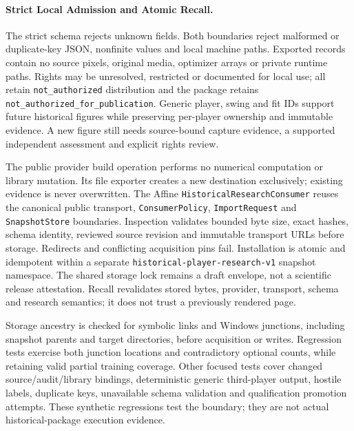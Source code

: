\documentclass[11pt,letterpaper]{article}
\newcommand{\code}[1]{\nolinkurl{#1}}
\begin{document}
\paragraph{Strict Local Admission and Atomic Recall.}
The strict schema rejects unknown fields. Both boundaries reject malformed or
duplicate-key JSON, nonfinite values and local machine paths. Exported records
contain no source pixels, original media, optimizer arrays or private runtime
paths. Rights may be unresolved, restricted or documented for local use;
all retain \code{not\_authorized} distribution and the package retains
\code{not\_authorized\_for\_publication}. Generic player, swing and fit IDs
support future historical figures while preserving per-player ownership and
immutable evidence. A new figure still needs source-bound capture evidence,
a supported independent assessment and explicit rights review.

The public provider build operation performs no numerical computation or
library mutation. Its file exporter creates a new destination exclusively;
existing evidence is never overwritten. The Affine
\code{HistoricalResearchConsumer} reuses the canonical public transport,
\code{ConsumerPolicy}, \code{ImportRequest} and \code{SnapshotStore} boundaries.
Inspection validates bounded byte size, exact hashes, schema identity, reviewed
source revision and immutable transport URLs before storage. Redirects and
conflicting acquisition pins fail. Installation is atomic and idempotent within
a separate \code{historical-player-research-v1} snapshot namespace. The shared
storage lock remains a draft envelope, not a scientific release attestation.
Recall revalidates stored bytes, provider, transport, schema and research
semantics; it does not trust a previously rendered page.

Storage ancestry is checked for symbolic links and Windows junctions, including
snapshot parents and target directories, before acquisition or writes.
Regression tests exercise both junction locations and contradictory optional
counts, while retaining valid partial training coverage. Other focused tests
cover changed source/audit/library bindings, deterministic generic third-player
output, hostile labels, duplicate keys, unavailable schema validation and
qualification promotion attempts. These synthetic regressions test the
boundary; they are not actual historical-package execution evidence.
\end{document}
